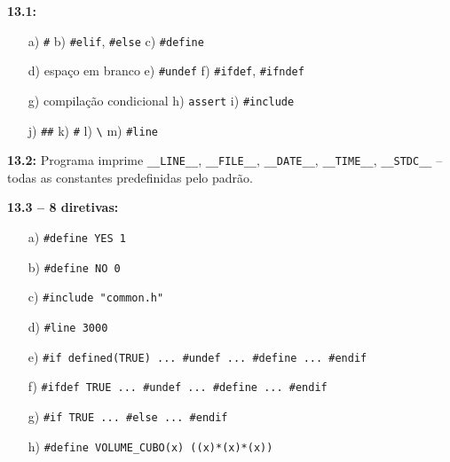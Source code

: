 \documentclass[12pt,a4paper]{article}
\begin{document}
\begin{tcolorbox}[colback=deitellightblue,colframe=deitelblue,title={\bfseries\large Respostas Resumidas}]

\textbf{13.1:}
\begin{itemize}[noitemsep]
  \item[a)] \texttt{\#} \quad b) \texttt{\#elif}, \texttt{\#else} \quad c) \texttt{\#define}
  \item[d)] espaço em branco \quad e) \texttt{\#undef} \quad f) \texttt{\#ifdef}, \texttt{\#ifndef}
  \item[g)] compilação condicional \quad h) \texttt{assert} \quad i) \texttt{\#include}
  \item[j)] \texttt{\#\#} \quad k) \texttt{\#} \quad l) \texttt{\textbackslash}
  \quad m) \texttt{\#line}
\end{itemize}

\medskip\textbf{13.2:} Programa imprime \texttt{\_\_LINE\_\_}, \texttt{\_\_FILE\_\_},
\texttt{\_\_DATE\_\_}, \texttt{\_\_TIME\_\_}, \texttt{\_\_STDC\_\_} -- todas as
constantes predefinidas pelo padrão.

\medskip\textbf{13.3 -- 8 diretivas:}
\begin{itemize}[noitemsep]
  \item[a)] \texttt{\#define YES 1}
  \item[b)] \texttt{\#define NO 0}
  \item[c)] \texttt{\#include "common.h"}
  \item[d)] \texttt{\#line 3000}
  \item[e)] \texttt{\#if defined(TRUE) ... \#undef ... \#define ... \#endif}
  \item[f)] \texttt{\#ifdef TRUE ... \#undef ... \#define ... \#endif}
  \item[g)] \texttt{\#if TRUE ... \#else ... \#endif}
  \item[h)] \texttt{\#define VOLUME\_CUBO(x) ((x)*(x)*(x))}
\end{itemize}

\end{tcolorbox}
\end{document}
